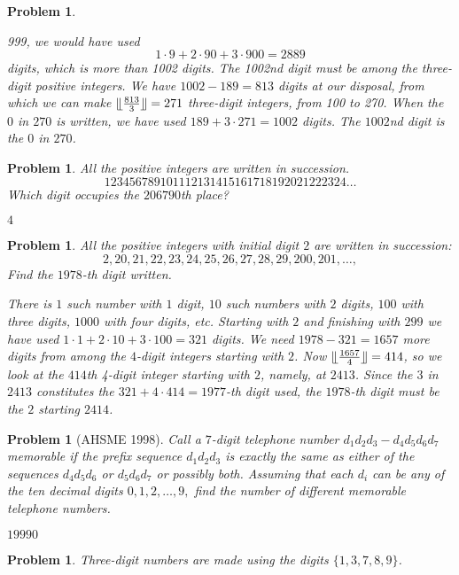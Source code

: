 \documentclass[11pt, openany]{book}
\theoremstyle{change} \theoremheaderfont{\blue\sffamily\bfseries}
\newtheorem{pro}[thm]{Problem}
\theoremstyle{nonumberplain} \theoremheaderfont{\sffamily\bfseries}
\newcommand{\í}{\'{\i}}
\begin{document}
\begin{multicols}{2}
\begin{pro}
\begin{answer}
999, we would have used
$$1\cdot 9 + 2\cdot 90  + 3\cdot 900 =  2889$$digits, which is more than 1002 digits. The 1002nd
digit must be among the three-digit positive integers. We have $1002
- 189 = 813$ digits at our disposal, from which we can make
$\llfloor\frac{813}{3}\rrfloor = 271$ three-digit integers, from 100
to 270. When the $0$ in $270$ is written, we have used $189 + 3\cdot
271 = 1002$ digits. The $1002$nd digit is the $0$ in $270$.
\end{answer}
\end{pro}
\begin{pro} All the positive integers are written in succession.
$$ 123456789101112131415161718192021222324 \ldots $$
Which digit occupies the  $206790$th place?
\begin{answer}$4$
\end{answer}
\end{pro}
\begin{pro}
All the positive integers with initial digit $2$ are written in
succession:
$$2, 20, 21, 22, 23, 24, 25, 26, 27, 28, 29, 200, 201, \ldots,    $$
Find the $1978$-th digit written.
\begin{answer}
 There is $1$ such number with $1$ digit, $10$ such numbers with
$2$ digits, $100$ with three digits, $1000$ with four digits, etc.
Starting with $2$ and finishing with $299$ we have used $1\cdot 1 +
2\cdot 10 + 3\cdot 100 = 321$ digits. We need $1978 - 321 = 1657$
more digits from among the $4$-digit integers starting with $2$. Now
$ \llfloor \frac{1657}{4} \rrfloor = 414$, so we look at the $414$th
4-digit integer starting with $2$, namely, at $2413$. Since the $3$
in $2413$ constitutes the $321 + 4\cdot 414 = 1977$-th digit used,
the $1978$-th digit must be the $2$ starting $2414$.
\end{answer}
\end{pro}
         \begin{pro}[AHSME 1998] Call a  $7$-digit telephone number
$d_1d_2d_3-d_4d_5d_6d_7$ {\em memorable} if the prefix sequence
$d_1d_2d_3$ is exactly the same as either of the sequences
$d_4d_5d_6$ or $d_5d_6d_7$ or possibly both. Assuming that each
$d_i$ can be any of the ten decimal digits $0,1,2,\ldots , 9,$ find
the number of different memorable telephone numbers.
\begin{answer} $19990$
\end{answer}
    \end{pro}
           \begin{pro}
Three-digit numbers are made using the digits $\{1, 3,7,8,9\}$.

\end{pro}
\end{multicols}
\end{document}
